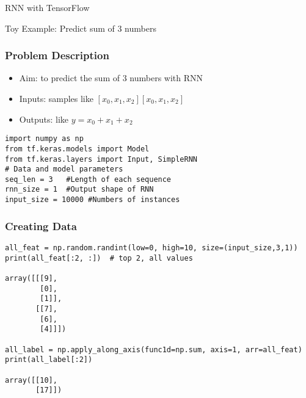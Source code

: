 \begin{frame}
  \begin{center}
    {\Large RNN with TensorFlow}
    
  \end{center}
\end{frame}

\begin{frame}
  \begin{center}
    {\Large Toy Example: Predict sum of 3 numbers}
    
  \end{center}
\end{frame}

\begin{frame}[fragile] \frametitle{Problem Description}
\begin{itemize}
\item Aim: to predict the sum of 3 numbers with RNN
\item Inputs: samples like $[x_0,x_1,x_2][x_0,x_1,x_2]$
\item Outputs: like $y = x_0 + x_1 + x_2$
\end{itemize}


\begin{lstlisting}
import numpy as np
from tf.keras.models import Model
from tf.keras.layers import Input, SimpleRNN
# Data and model parameters
seq_len = 3   #Length of each sequence 
rnn_size = 1  #Output shape of RNN
input_size = 10000 #Numbers of instances
\end{lstlisting}
\end{frame}

\begin{frame}[fragile] \frametitle{Creating Data}
\begin{lstlisting}
all_feat = np.random.randint(low=0, high=10, size=(input_size,3,1))
print(all_feat[:2, :])  # top 2, all values

array([[[9],
        [0],
        [1]],
       [[7],
        [6],
        [4]]])
				
all_label = np.apply_along_axis(func1d=np.sum, axis=1, arr=all_feat)
print(all_label[:2])

array([[10],
       [17]])
\end{lstlisting}
\end{frame}

